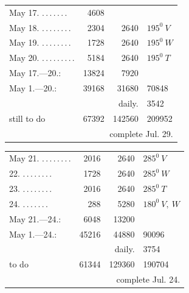 \begin{center}
\begin{tabular}{@{}p{.36\linewidth}rrl@{}}
May 17. \BJournalDay{☉}\nobreak\hspace{.2em}\mbox{.\,.\,.\,.\,.\,.\,.}\hfill&4608&&\\
May 18. \BJournalDay{☾}\nobreak\hspace{.2em}\mbox{.\,.\,.\,.\,.\,.\,.\,.}\hfill&2304&2640&\(\mathit{195}^0\ V\)\\
May 19. \BJournalDay{♂}\nobreak\hspace{.2em}\mbox{.\,.\,.\,.\,.\,.\,.\,.}\hfill&1728&2640&\(\mathit{195}^0\ W\)\\
May 20. \BJournalDay{☿}\nobreak\hspace{.2em}\mbox{.\,.\,.\,.\,.\,.\,.\,.\,.}\hfill&5184&2640&\(\mathit{195}^0\ T\)\\
\hfill May 17.—20.:&13824&7920&\\
\hfill May 1.—20.:&39168&31680&70848\\
&&daily.&3542\\
\hfill still to do&67392&142560&209952\\
\multicolumn{4}{r}{complete Jul. 29.}\\
\hline
\end{tabular}
\end{center}
\begin{center}
\begin{tabular}{@{}p{.36\linewidth}rrl@{}}
May 21. \BJournalDay{♃}\nobreak\hspace{.2em}\mbox{.\,.\,.\,.\,.\,.\,.\,.}\hfill&2016&2640&\(\mathit{285}^0\ V\)\\
\hspace*{\fill}22. \BJournalDay{♀}\nobreak\hspace{.2em}\mbox{.\,.\,.\,.\,.\,.\,.\,.}\hfill&1728&2640&\(\mathit{285}^0\ W\)\\
\hspace*{\fill}23. \BJournalDay{♄}\nobreak\hspace{.2em}\mbox{.\,.\,.\,.\,.\,.\,.\,.}\hfill&2016&2640&\(\mathit{285}^0\ T\)\\
\hspace*{\fill}24. \BJournalDay{☉}\nobreak\hspace{.2em}\mbox{.\,.\,.\,.\,.\,.\,.}\hfill&288&5280&\(\mathit{180}^0\ V,\ W\)\\
\hfill May 21.—24.:&6048&13200&\\
\hfill May 1.—24.:&45216&44880&90096\\
&&daily.&3754\\
\hfill to do&61344&129360&190704\\
\multicolumn{4}{r}{complete Jul. 24.}\\
\hline
\end{tabular}
\end{center}
\endgroup
\endgroup
\clearpage
\endgroup
